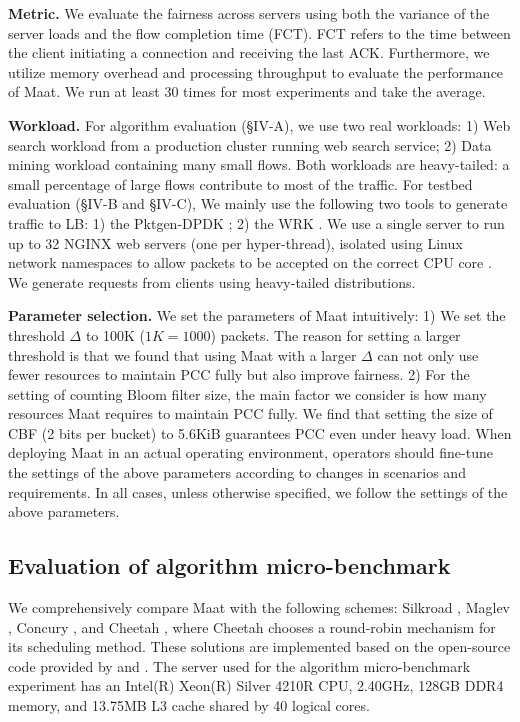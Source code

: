 \textbf{Metric.} We evaluate the fairness across servers using both the variance of the server loads and the flow completion time (FCT). FCT refers to the time between the client initiating a connection and receiving the last ACK. Furthermore, we utilize memory overhead and processing throughput to evaluate the performance of Maat. We run at least 30 times for most experiments and take the average.

\textbf{Workload.} For algorithm evaluation (\S IV-A), we use two real workloads: 1) Web search workload \cite{alizadeh2010data} from a production cluster running web search service; 2) Data mining workload \cite{montazeri2018homa} containing many small flows. Both workloads are heavy-tailed: a small percentage of large flows contribute to most of the traffic. For testbed evaluation (\S IV-B and \S IV-C), We mainly use the following two tools to generate traffic to LB: 1) the  Pktgen-DPDK \cite{pktgenDPDK}; 2) the WRK \cite{glozer2020wrk}. We use a single server to run up to 32 NGINX web servers (one per hyper-thread), isolated using Linux network namespaces to allow packets to be accepted on the correct CPU core \cite{barbette2021cheetah}. We generate requests from clients using heavy-tailed distributions.

\textbf{Parameter selection.} We set the parameters of Maat intuitively: 1) We set the threshold $\Delta$ to 100K ($1K=1000$) packets. The reason for setting a larger threshold is that we found that using Maat with a larger $\Delta$ can not only use fewer resources to maintain PCC fully but also improve fairness. 2) For the setting of counting Bloom filter size, the main factor we consider is how many resources Maat requires to maintain PCC fully. We find that setting the size of CBF (2 bits per bucket) to 5.6KiB guarantees PCC even under heavy load. When deploying Maat in an actual operating environment, operators should fine-tune the settings of the above parameters according to changes in scenarios and requirements. In all cases, unless otherwise specified, we follow the settings of the above parameters.

\subsection{Evaluation of algorithm micro-benchmark}
 We comprehensively compare Maat with the following schemes: Silkroad \cite{miao2017silkroad}, Maglev \cite{eisenbud2016maglev}, Concury \cite{shi2020concury}, and Cheetah \cite{barbette2021cheetah}, where Cheetah chooses a round-robin mechanism for its scheduling method. These solutions are implemented based on the open-source code provided by \cite{cheetah} and \cite{concury2019}. The server used for the algorithm micro-benchmark experiment has an Intel(R) Xeon(R) Silver 4210R CPU, 2.40GHz, 128GB DDR4 memory, and 13.75MB L3 cache shared by 40 logical cores.
 
